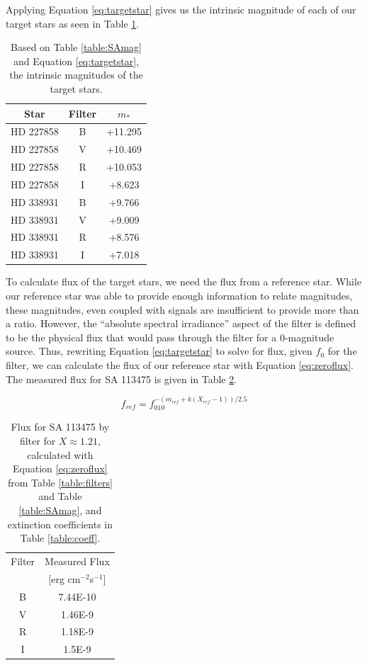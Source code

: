 \documentclass{article}
\begin{document}
Applying Equation \ref{eq:targetstar} gives us the intrinsic magnitude of each of our target stars as seen in Table \ref{table:relmag}.

\begin{table}
\begin{center}
\begin{tabular}{c | c | c }
Star & Filter & $m_*$\\
\hline
HD 227858 & B & +11.295\\
HD 227858 & V & +10.469 \\
HD 227858 & R & +10.053 \\
HD 227858 & I &   +8.623 \\
HD 338931 & B & +9.766 \\
HD 338931 & V & +9.009\\
HD 338931 & R &  +8.576\\
HD 338931 & I & +7.018
\end{tabular}
\end{center}
\caption{Based on Table \ref{table:SAmag} and Equation \ref{eq:targetstar}, the intrinsic magnitudes of the target stars.}
\label{table:relmag}
\end{table}

To calculate flux of the target stars, we need the flux from a reference star. While our reference star was able to provide enough information to relate magnitudes,
these magnitudes, even coupled with signals are insufficient to provide more than a ratio. However, the ``absolute spectral irradiance''
aspect of the filter is defined to be the physical flux that would pass through the filter for a 0-magnitude source. Thus, rewriting Equation
\ref{eq:targetstar} to solve for flux, given $f_0$ for the filter, we can calculate the flux of our reference star with Equation \ref{eq:zeroflux}. 
The measured flux for SA 113475 is given in Table \ref{table:SAflux}.

\begin{equation}
\label{eq:zeroflux}
f_{ref}=f_010^{-(m_{ref}+k(X_{ref}-1))/2.5}
\end{equation}

\begin{table}
\begin{center}
\begin{tabular}{c | c}
Filter & Measured Flux \\
& [erg cm$^{-2}$s$^{-1}$]\\
\hline
B & 7.44E-10\\
V & 1.46E-9\\
R & 1.18E-9\\
I & 1.5E-9
\end{tabular}
\caption{Flux for SA 113475 by filter for $X\approx1.21$, calculated with Equation \ref{eq:zeroflux} from Table \ref{table:filters}
and Table \ref{table:SAmag}, and extinction coefficients in Table \ref{table:coeff}.}
\label{table:SAflux}
\end{center}
\end{table}
\end{document}
